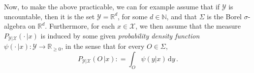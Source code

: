 \documentclass[twoside,11pt]{article}
\newcommand{\nats}{\mathbb{N}}
\newcommand{\reals}{\mathbb{R}}
\newcommand{\realsnonneg}{\reals_{\geq 0}}
\newcommand{\states}{\mathcal{X}}
\newcommand{\observs}{\mathcal{Y}}
\newcommand{\coloneqq}{:\!=}
\begin{document}
Now, to make the above practicable, we can for example assume that if $\observs$ is uncountable, then it is the set $\observs=\reals^d$, for some $d\in\nats$, and that $\Sigma$ is the Borel $\sigma$-algebra on $\reals^d$. 
Furthermore, for each $x\in\states$, we then assume that the measure $P_{\observs\vert\states}(\cdot\,\vert x)$ is induced by some given \emph{probability density function} $\psi(\cdot\,\vert x):\observs\to\realsnonneg$, in the sense that for every $O\in\Sigma$,
\begin{equation*}
P_{\observs\vert\states}(O\,\vert x) \coloneqq \int_O \psi(y\vert x)\,\mathrm{d}y\,.
\end{equation*}
\end{document}
